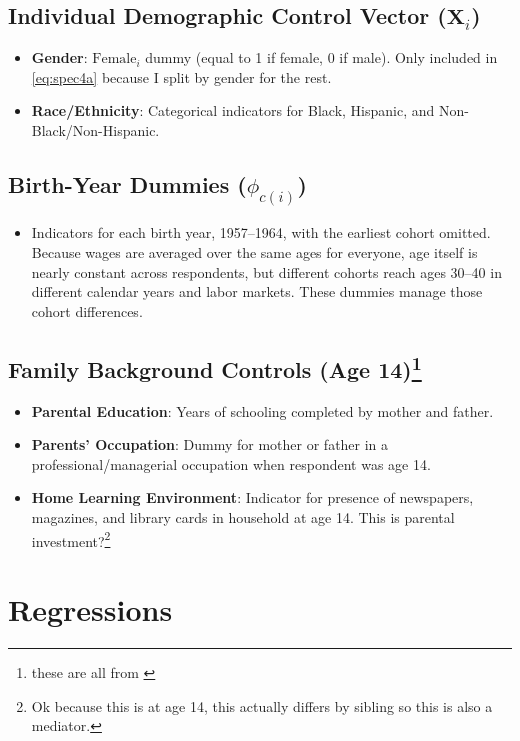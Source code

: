 \documentclass[12pt]{article}
\begin{document}
\subsection*{Individual Demographic Control Vector ($\mathbf{X}_{i}$)}
\begin{itemize}
    \item \textbf{Gender}: $\text{Female}_i$ dummy (equal to 1 if female, 0 if male). Only included in \eqref{eq:spec4a} because I split by gender for the rest.
    \item \textbf{Race/Ethnicity}: Categorical indicators for Black, Hispanic, and Non-Black/Non-Hispanic.
\end{itemize}

\subsection*{Birth-Year Dummies ($\phi_{c(i)}$)}
\begin{itemize}
\item Indicators for each birth year, 1957--1964, with the earliest cohort omitted. Because wages are averaged over the same ages for everyone, age itself is nearly constant across respondents, but different cohorts reach ages 30--40 in different calendar years and labor markets. These dummies manage those cohort differences.
\end{itemize}

\subsection*{Family Background Controls (Age 14)\footnote{these are all from \citet{kess}}}
\begin{itemize}
    \item \textbf{Parental Education}: Years of schooling completed by mother and father.
    \item \textbf{Parents' Occupation}: Dummy for mother or father in a professional/managerial occupation when respondent was age 14.
    \item \textbf{Home Learning Environment}: Indicator for presence of newspapers, magazines, and library cards in household at age 14. This is parental investment?\footnote{Ok because this is at age 14, this actually differs by sibling so this is also a mediator.}
\end{itemize}

\section{Regressions}
\end{document}
